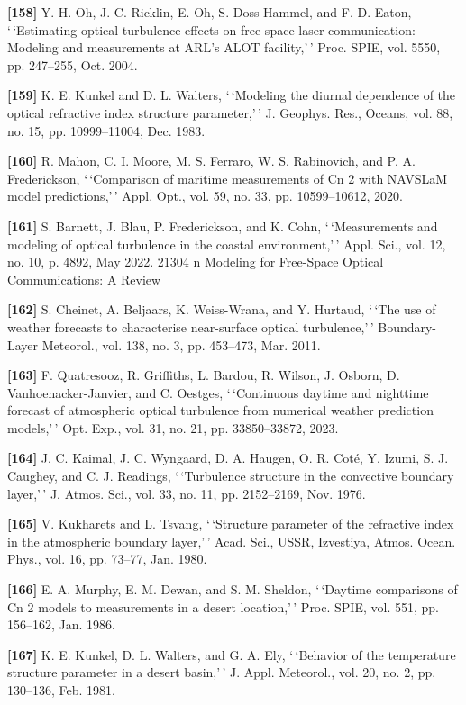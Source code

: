 \documentclass[
]{article}
\begin{document}
\textbf{{[}158{]}} Y. H. Oh, J. C. Ricklin, E. Oh, S. Doss-Hammel, and
F. D. Eaton, `\,`Estimating optical turbulence effects on free-space
laser communication: Modeling and measurements at ARL's ALOT
facility,'\,' Proc. SPIE, vol. 5550, pp. 247--255, Oct. 2004.

\textbf{{[}159{]}} K. E. Kunkel and D. L. Walters, `\,`Modeling the
diurnal dependence of the optical refractive index structure
parameter,'\,' J. Geophys. Res., Oceans, vol. 88, no. 15, pp.
10999--11004, Dec. 1983.

\textbf{{[}160{]}} R. Mahon, C. I. Moore, M. S. Ferraro, W. S.
Rabinovich, and P. A. Frederickson, `\,`Comparison of maritime
measurements of Cn 2 with NAVSLaM model predictions,'\,' Appl. Opt.,
vol. 59, no. 33, pp. 10599--10612, 2020.

\textbf{{[}161{]}} S. Barnett, J. Blau, P. Frederickson, and K. Cohn,
`\,`Measurements and modeling of optical turbulence in the coastal
environment,'\,' Appl. Sci., vol. 12, no. 10, p. 4892, May 2022. 21304 n
Modeling for Free-Space Optical Communications: A Review

\textbf{{[}162{]}} S. Cheinet, A. Beljaars, K. Weiss-Wrana, and Y.
Hurtaud, `\,`The use of weather forecasts to characterise near-surface
optical turbulence,'\,' Boundary-Layer Meteorol., vol. 138, no. 3, pp.
453--473, Mar. 2011.

\textbf{{[}163{]}} F. Quatresooz, R. Griffiths, L. Bardou, R. Wilson, J.
Osborn, D. Vanhoenacker-Janvier, and C. Oestges, `\,`Continuous daytime
and nighttime forecast of atmospheric optical turbulence from numerical
weather prediction models,'\,' Opt. Exp., vol. 31, no. 21, pp.
33850--33872, 2023.

\textbf{{[}164{]}} J. C. Kaimal, J. C. Wyngaard, D. A. Haugen, O. R.
Coté, Y. Izumi, S. J. Caughey, and C. J. Readings, `\,`Turbulence
structure in the convective boundary layer,'\,' J. Atmos. Sci., vol. 33,
no. 11, pp. 2152--2169, Nov. 1976.

\textbf{{[}165{]}} V. Kukharets and L. Tsvang, `\,`Structure parameter
of the refractive index in the atmospheric boundary layer,'\,' Acad.
Sci., USSR, Izvestiya, Atmos. Ocean. Phys., vol. 16, pp. 73--77, Jan.
1980.

\textbf{{[}166{]}} E. A. Murphy, E. M. Dewan, and S. M. Sheldon,
`\,`Daytime comparisons of Cn 2 models to measurements in a desert
location,'\,' Proc. SPIE, vol. 551, pp. 156--162, Jan. 1986.

\textbf{{[}167{]}} K. E. Kunkel, D. L. Walters, and G. A. Ely,
`\,`Behavior of the temperature structure parameter in a desert
basin,'\,' J. Appl. Meteorol., vol. 20, no. 2, pp. 130--136, Feb. 1981.
\end{document}
